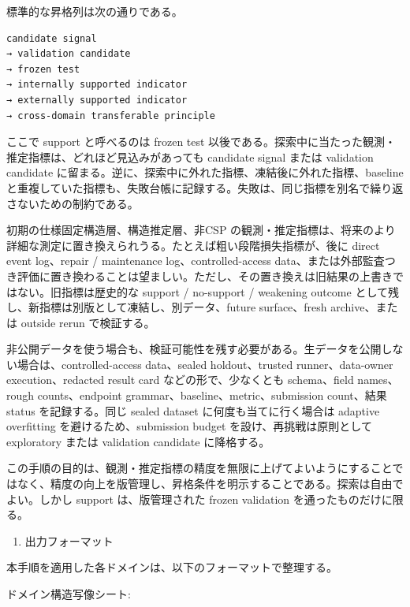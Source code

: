 \documentclass[12pt,a4paper]{article}
\begin{document}
標準的な昇格列は次の通りである。

\begin{verbatim}
candidate signal
→ validation candidate
→ frozen test
→ internally supported indicator
→ externally supported indicator
→ cross-domain transferable principle
\end{verbatim}

ここで support と呼べるのは frozen test 以後である。探索中に当たった観測・推定指標は、どれほど見込みがあっても candidate signal または validation candidate に留まる。逆に、探索中に外れた指標、凍結後に外れた指標、baseline と重複していた指標も、失敗台帳に記録する。失敗は、同じ指標を別名で繰り返さないための制約である。

初期の仕様固定構造層、構造推定層、非CSP の観測・推定指標は、将来のより詳細な測定に置き換えられうる。たとえば粗い段階損失指標が、後に direct event log、repair / maintenance log、controlled-access data、または外部監査つき評価に置き換わることは望ましい。ただし、その置き換えは旧結果の上書きではない。旧指標は歴史的な support / no-support / weakening outcome として残し、新指標は別版として凍結し、別データ、future surface、fresh archive、または outside rerun で検証する。

非公開データを使う場合も、検証可能性を残す必要がある。生データを公開しない場合は、controlled-access data、sealed holdout、trusted runner、data-owner execution、redacted result card などの形で、少なくとも schema、field names、rough counts、endpoint grammar、baseline、metric、submission count、結果 status を記録する。同じ sealed dataset に何度も当てに行く場合は adaptive overfitting を避けるため、submission budget を設け、再挑戦は原則として exploratory または validation candidate に降格する。

この手順の目的は、観測・推定指標の精度を無限に上げてよいようにすることではなく、精度の向上を版管理し、昇格条件を明示することである。探索は自由でよい。しかし support は、版管理された frozen validation を通ったものだけに限る。

\begin{enumerate}
\def\labelenumi{\arabic{enumi}.}
\setcounter{enumi}{5}
\tightlist
\item
  出力フォーマット
\end{enumerate}

本手順を適用した各ドメインは、以下のフォーマットで整理する。

ドメイン構造写像シート:
\end{document}
